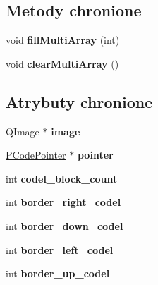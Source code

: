 \subsection*{Metody chronione}
\begin{CompactItemize}
\item 
\hypertarget{classPBlockManager_c31dc0993286be444a82ae5e51f32415}{
void \textbf{fillMultiArray} (int)}
\label{classPBlockManager_c31dc0993286be444a82ae5e51f32415}

\item 
\hypertarget{classPBlockManager_ab82616c7ee28fa12d4cfec944f550a0}{
void \textbf{clearMultiArray} ()}
\label{classPBlockManager_ab82616c7ee28fa12d4cfec944f550a0}

\end{CompactItemize}
\subsection*{Atrybuty chronione}
\begin{CompactItemize}
\item 
\hypertarget{classPBlockManager_429ddf44eba8dc97ccd38d67d4b8172f}{
QImage $\ast$ \textbf{image}}
\label{classPBlockManager_429ddf44eba8dc97ccd38d67d4b8172f}

\item 
\hypertarget{classPBlockManager_835bfe00bdbea928d1b4ad6212cf733c}{
\hyperlink{classPCodePointer}{PCodePointer} $\ast$ \textbf{pointer}}
\label{classPBlockManager_835bfe00bdbea928d1b4ad6212cf733c}

\item 
\hypertarget{classPBlockManager_679ed25c188f4a6d2fd20a167a4bb4eb}{
int \textbf{codel\_\-block\_\-count}}
\label{classPBlockManager_679ed25c188f4a6d2fd20a167a4bb4eb}

\item 
\hypertarget{classPBlockManager_8d73c339ef6be4cd3a960b96b0c4f1fe}{
int \textbf{border\_\-right\_\-codel}}
\label{classPBlockManager_8d73c339ef6be4cd3a960b96b0c4f1fe}

\item 
\hypertarget{classPBlockManager_9a2e17b1fa59c0b083e760a385b3565f}{
int \textbf{border\_\-down\_\-codel}}
\label{classPBlockManager_9a2e17b1fa59c0b083e760a385b3565f}

\item 
\hypertarget{classPBlockManager_2bb1887ef5658a211da5edbc3a248058}{
int \textbf{border\_\-left\_\-codel}}
\label{classPBlockManager_2bb1887ef5658a211da5edbc3a248058}

\item 
\hypertarget{classPBlockManager_80de22998ec78cc92162eadd6036506f}{
int \textbf{border\_\-up\_\-codel}}
\label{classPBlockManager_80de22998ec78cc92162eadd6036506f}

\end{CompactItemize}


